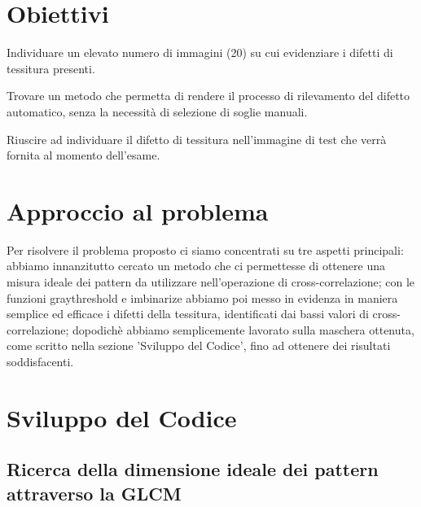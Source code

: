 \documentclass[a4paper]{article}
\begin{document}
\section{Obiettivi}
 
\begin{enumerate}
\setlength{\baselineskip}{0.8cm}

{\vspace{0.5cm}\fontsize{6mm}{6mm}\selectfont 
\item Individuare un elevato numero di immagini (20) su cui evidenziare i difetti di tessitura presenti.
}

{\vspace{0.5cm}\fontsize{6mm}{6mm}\selectfont
\item Trovare un metodo che permetta di rendere il processo di rilevamento del difetto automatico,
senza la necessità di selezione di soglie manuali.
}

{\vspace{0.5cm}\fontsize{6mm}{6mm}\selectfont
\item Riuscire ad individuare il difetto di tessitura nell'immagine di test che verrà fornita al momento dell'esame.
}

\end{enumerate}

\section{Approccio al problema}
\setlength{\baselineskip}{0.8cm}
    {\vspace{0.5cm}\fontsize{6mm}{6mm}\selectfont Per risolvere il problema proposto ci siamo concentrati su tre aspetti principali: 
abbiamo innanzitutto cercato un metodo che ci permettesse di ottenere una misura ideale dei pattern da utilizzare nell'operazione di cross-correlazione;
con le funzioni graythreshold e imbinarize abbiamo poi messo in evidenza in maniera semplice ed efficace i difetti della tessitura, identificati dai bassi valori di cross-correlazione;
dopodichè abbiamo semplicemente lavorato sulla maschera ottenuta, come scritto nella sezione 'Sviluppo del Codice', fino ad ottenere dei risultati soddisfacenti.   }


\section{Sviluppo del Codice}
    \subsection{Ricerca della dimensione ideale dei pattern attraverso la GLCM}
\end{document}
